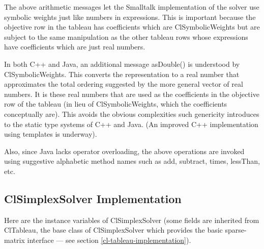 \documentclass{article}
\begin{document}
The above arithmetic messages let the Smalltalk implementation of the
solver use symbolic weights just like numbers in expressions.  This is
important because the objective row in the tableau has coefficients
which are {\sf ClSymbolicWeight}s but are subject to the same
manipulation as the other tableau rows whose expressions have
coefficients which are just real numbers.

In both C++ and Java, an additional message {\sf asDouble()} is understood
by {\sf ClSymbolicWeight}s.  This converts the representation to a real
number that approximates the total ordering suggested by the more
general vector of real numbers.  It is these real numbers that are used
as the coefficients in the objective row of the tableau (in lieu of {\sf
  ClSymbolicWeight}s, which the coefficients conceptually are).  This
avoids the obvious complexities such genericity introduces to the static
type systems of C++ and Java. (An improved C++ implementation using
templates is underway).

Also, since Java lacks operator overloading, the above operations are
invoked using suggestive alphabetic method names such as {\sf add}, {\sf
  subtract}, {\sf times}, {\sf lessThan}, etc.


\subsection{{\sf ClSimplexSolver} Implementation}
\label{cl-simplex-solver-implementation}

Here are the instance variables of {\sf ClSimplexSolver} (some fields
are inherited from {\sf ClTableau}, the base class of {\sf
  ClSimplexSolver} which provides the basic sparse-matrix interface ---
see section \ref{cl-tableau-implementation}).
\end{document}
